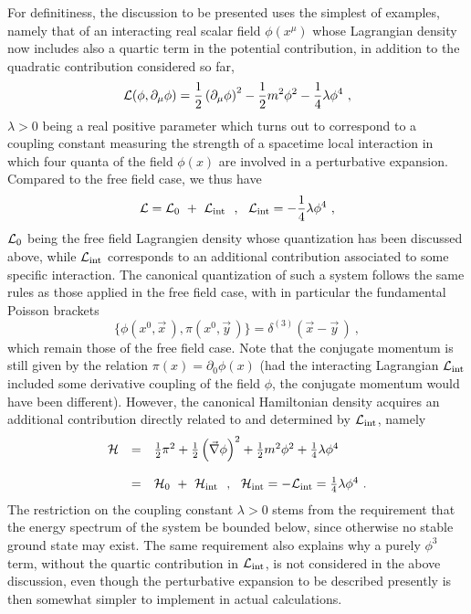 \documentclass[a4paper,11pt]{article}
\begin{document}
For definitiness, the discussion to be presented uses the simplest of
examples, namely that of an interacting real scalar field $\phi(x^\mu)$
whose Lagrangian density now includes also a quartic term in the
potential contribution, in addition to the quadratic contribution
considered so far,
\begin{equation}
{\cal L}(\phi,\partial_\mu\phi)=\frac{1}{2}\left(\partial_\mu\phi\right)^2-
\frac{1}{2}m^2\phi^2-\frac{1}{4}\lambda\phi^4\ ,
\end{equation}
$\lambda>0$ being a real positive parameter which turns out to correspond
to a coupling constant measuring the strength of a spacetime local interaction 
in which four quanta of the field $\phi(x)$ are involved in a perturbative 
expansion. Compared to the free field case, we thus have
\begin{equation}
{\cal L}={\cal L}_0\ +\ {\cal L}_{\rm int}\ \ ,\ \ 
{\cal L}_{\rm int}=-\frac{1}{4}\lambda\phi^4\ ,
\end{equation}
${\cal L}_0$ being the free field Lagrangien density whose quantization
has been discussed above, while ${\cal L}_{\rm int}$ corresponds
to an additional contribution associated to some specific interaction.
The canonical quantization of such a system follows the same rules as those
applied in the free field case, with in particular the fundamental
Poisson brackets
\begin{equation}
\{\phi(x^0,\vec{x}\,),\pi(x^0,\vec{y}\,)\}=
\delta^{(3)}\left(\vec{x}-\vec{y}\,\right)\ ,
\end{equation}
which remain those of the free field case. Note that the conjugate momentum
is still given by the relation $\pi(x)=\partial_0\phi(x)$ (had
the interacting Lagrangian ${\cal L}_{\rm int}$ included some derivative 
coupling of the field $\phi$, the conjugate momentum would have been 
different). However, the canonical Hamiltonian density acquires an 
additional contribution directly related to and determined by 
${\cal L}_{\rm int}$, namely
\begin{equation}
\begin{array}{r c l}
{\cal H}&=&\frac{1}{2}\pi^2+\frac{1}{2}\left(\vec{\nabla}\phi\right)^2
+\frac{1}{2}m^2\phi^2+\frac{1}{4}\lambda\phi^4\\
 & & \\
&=&{\cal H}_0\ + \ {\cal H}_{\rm int}\ \ ,\ \ 
{\cal H}_{\rm int}=-{\cal L}_{\rm int}=\frac{1}{4}\lambda\phi^4\ .
\end{array}
\end{equation}
The restriction on the coupling constant $\lambda>0$ stems from the
requirement that the energy spectrum of the system be bounded below,
since otherwise no stable ground state may exist. The same requirement
also explains why a purely $\phi^3$ term, without the quartic contribution
in ${\cal L}_{\rm int}$, is not considered in the above discussion,
even though the perturbative expansion to be described presently is then 
somewhat simpler to implement in actual calculations.
\end{document}
